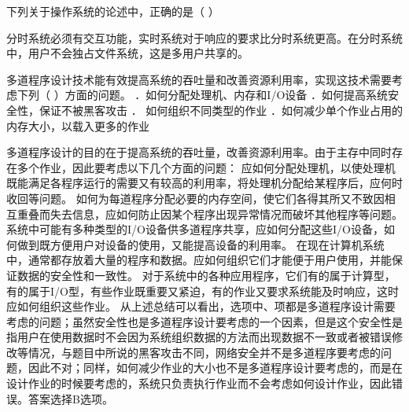 \question 下列关于操作系统的论述中，正确的是（ ）
\par{}
\begin{solution}分时系统必须有交互功能，实时系统对于响应的要求比分时系统更高。在分时系统中，用户不会独占文件系统，这是多用户共享的。
\end{solution}
\question 多道程序设计技术能有效提高系统的吞吐量和改善资源利用率，实现这技术需要考虑下列（
）方面的问题。 ．如何分配处理机、内存和I/O设备
．如何提高系统安全性，保证不被黑客攻击 ． 如何组织不同类型的作业
．如何减少单个作业占用的内存大小，以载入更多的作业
\par{}
\begin{solution}多道程序设计的目的在于提高系统的吞吐量，改善资源利用率。由于主存中同时存在多个作业，因此要考虑以下几个方面的问题：
应如何分配处理机，以使处理机既能满足各程序运行的需要又有较高的利用率，将处理机分配给某程序后，应何时收回等问题。
如何为每道程序分配必要的内存空间，使它们各得其所又不致因相互重叠而失去信息，应如何防止因某个程序出现异常情况而破坏其他程序等问题。
系统中可能有多种类型的I/O设备供多道程序共享，应如何分配这些I/O设备，如何做到既方便用户对设备的使用，又能提高设备的利用率。
在现在计算机系统中，通常都存放着大量的程序和数据。应如何组织它们才能便于用户使用，并能保证数据的安全性和一致性。
对于系统中的各种应用程序，它们有的属于计算型，有的属于I/O型，有些作业既重要又紧迫，有的作业又要求系统能及时响应，这时应如何组织这些作业。
从上述总结可以看出，选项中、项都是多道程序设计需要考虑的问题；虽然安全性也是多道程序设计要考虑的一个因素，但是这个安全性是指用户在使用数据时不会因为系统组织数据的方法而出现数据不一致或者被错误修改等情况，与题目中所说的黑客攻击不同，网络安全并不是多道程序要考虑的问题，因此不对；同样，如何减少作业的大小也不是多道程序设计要考虑的，而是在设计作业的时候要考虑的，系统只负责执行作业而不会考虑如何设计作业，因此错误。答案选择B选项。
\end{solution}
